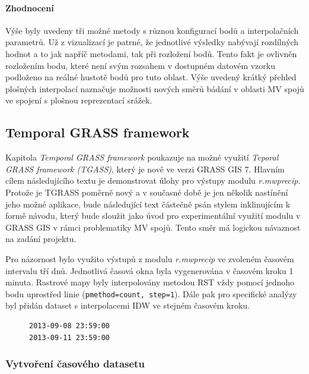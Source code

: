 \documentclass[a4paper,12pt,oneside]{report}
\begin{document}
\paragraph*{Zhodnocení}  Výše byly uvedeny tři možné metody s různou konfigurací bodů a interpolačních parametrů. Už z vizualizací je patrné, že jednotlivé výsledky nabývají rozdílných hodnot a to jak napříč metodami, tak při rozložení bodů. Tento fakt je  ovlivněn rozložením bodu, které není svým rozsahem v dostupném datovém vzorku podloženo na reálné hustotě bodů pro tuto oblast. Výše uvedený krátký přehled plošných interpolací naznačuje možnosti nových směrů bádání v oblasti MV spojů ve spojení s plošnou reprezentací srážek. 


\subsection{Temporal GRASS framework}
Kapitola \textit{Temporal GRASS framework} poukazuje na možné využití \textit{Teporal GRASS framework (TGASS)}, který je nově ve verzi GRASS GIS 7. Hlavním cílem následujícího textu je demonstrovat úlohy pro výstupy modulu \textit{r.mwprecip}. Protože je TGRASS poměrně nový a v současné době je jen několik nastínění jeho možné aplikace, bude následující text částečně psán stylem inklinujícím k formě návodu, který bude sloužit jako úvod pro experimentální využití modulu v GRASS GIS v rámci problematiky MV spojů. Tento směr má logickou návaznost na zadání projektu.


Pro názornost bylo využito výstupů z modulu \textit{r.mwprecip} ve zvoleném časovém intervalu tří dnů. Jednotlivá časová okna byla vygenerována v časovém kroku 1 minuta.  Rastrové mapy byly interpolovány metodou RST vždy pomocí jednoho bodu uprostřed linie (\texttt{pmethod=count, step=1}). Dále pak pro specifické analýzy byl přidán dataset s interpolacemi IDW ve stejném časovém kroku.
\begin{figure}[h!]
\begin{footnotesize}
\lstset{extendedchars=false,
escapeinside=''}
\begin{lstlisting}[style=mybash]
2013-09-08 23:59:00
2013-09-11 23:59:00                       
\end{lstlisting}
\end{footnotesize} 
\end{figure}


\subsubsection*{Vytvoření časového datasetu}
\end{document}
